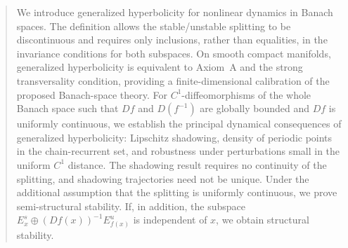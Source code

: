 \documentclass[12pt]{article}
\theoremstyle{definition}
\begin{document}
\begin{abstract}

We introduce generalized hyperbolicity for nonlinear dynamics in Banach spaces. The definition allows the stable/unstable splitting to be discontinuous and requires only inclusions, rather than equalities, in the invariance conditions for both subspaces.
On smooth compact manifolds, generalized hyperbolicity is equivalent to Axiom~A and the strong transversality condition, providing a finite-dimensional calibration of the proposed Banach-space theory.
For $C^1$-diffeomorphisms of the whole Banach space such that $Df$ and $D(f^{-1})$ are globally bounded and $Df$ is uniformly continuous, we establish the principal dynamical consequences of generalized hyperbolicity: Lipschitz shadowing, density of periodic points in the chain-recurrent set, and robustness under perturbations small in the uniform $C^1$ distance. 
The shadowing result requires no continuity of the splitting, and shadowing trajectories need not be unique.
Under the additional assumption that the splitting is uniformly continuous, we prove semi-structural stability. 
If, in addition, the subspace $E^s_x\oplus (Df(x))^{-1}E^u_{f(x)}$ is independent of $x$, we obtain structural stability.

\end{abstract}
\end{document}
